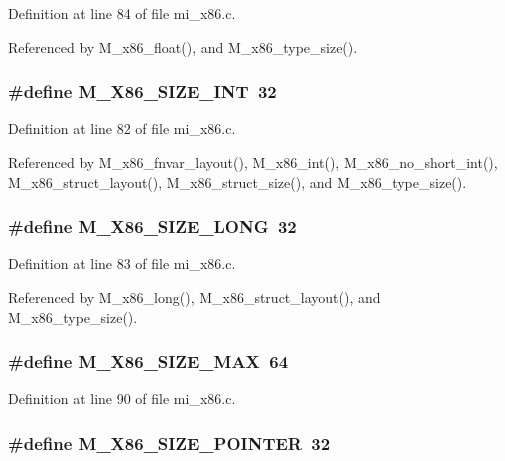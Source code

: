 Definition at line 84 of file mi\_\-x86.c.

Referenced by M\_\-x86\_\-float(), and M\_\-x86\_\-type\_\-size().
\subsubsection{\setlength{\rightskip}{0pt plus 5cm}\#define M\_\-X86\_\-SIZE\_\-INT~32}\label{mi__x86_8c_85eb1a82739558ac934d5f5554a58747}




Definition at line 82 of file mi\_\-x86.c.

Referenced by M\_\-x86\_\-fnvar\_\-layout(), M\_\-x86\_\-int(), M\_\-x86\_\-no\_\-short\_\-int(), M\_\-x86\_\-struct\_\-layout(), M\_\-x86\_\-struct\_\-size(), and M\_\-x86\_\-type\_\-size().
\subsubsection{\setlength{\rightskip}{0pt plus 5cm}\#define M\_\-X86\_\-SIZE\_\-LONG~32}\label{mi__x86_8c_b83f3a0d0afadfbd6d71d3e6f6b4fdba}




Definition at line 83 of file mi\_\-x86.c.

Referenced by M\_\-x86\_\-long(), M\_\-x86\_\-struct\_\-layout(), and M\_\-x86\_\-type\_\-size().
\subsubsection{\setlength{\rightskip}{0pt plus 5cm}\#define M\_\-X86\_\-SIZE\_\-MAX~64}\label{mi__x86_8c_b500e6ea368597c7fc2569c21dafb054}




Definition at line 90 of file mi\_\-x86.c.
\subsubsection{\setlength{\rightskip}{0pt plus 5cm}\#define M\_\-X86\_\-SIZE\_\-POINTER~32}\label{mi__x86_8c_2216e4f8255283b76d5d7956bd6f28df}




